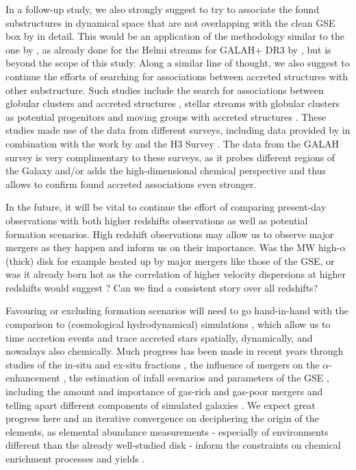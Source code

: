 \documentclass[fleqn,usenatbib]{mnras}
\begin{document}
In a follow-up study, we also strongly suggest to try to associate the found substructures in dynamical space that are not overlapping with the clean GSE box by \citet{Feuillet2021} in detail. This would be an application of the methodology similar to the one by \citet{Naidu2020}, as already done for the Helmi streams for GALAH+ DR3 by \citet{Limberg2021}, but is beyond the scope of this study. Along a similar line of thought, we also suggest to continue the efforts of searching for associations between accreted structures with other substructure. Such studies include the search for associations between globular clusters and accreted structures \citep{Massari2019}, stellar streams with globular clusters as potential progenitors \citep{Bonaca2021} and moving groups with accreted structures \citep{Schuler2021}. These studies made use of the data from different surveys, including data provided by \cite{Helmi2018b} in combination with the work by \citet{Vasiliev2019} and the H3 Survey \citep{Conroy2019}. The data from the GALAH survey is very complimentary to these surveys, as it probes different regions of the Galaxy and/or adds the high-dimensional chemical perspective and thus allows to confirm found accreted associations even stronger.

In the future, it will be vital to continue the effort of comparing present-day observations with both higher redshifts observations as well as potential formation scenarios. High redshift observations may allow us to observe major mergers as they happen and inform us on their importance. Was the MW high-$\alpha$ (thick) disk for example heated up by major mergers like those of the GSE, or was it already born hot as the correlation of higher velocity dispersions at higher redshifts would suggest \citep{Wisnioski2015, Leaman2017}? Can we find a consistent story over all redshifts?

Favouring or excluding formation scenarios will need to go hand-in-hand with the comparison to (cosmological hydrodynamical) simulations \citep[e.g.][]{Mackereth2018, Bonaca2017, Wu2021}, which allow us to time accretion events and trace accreted stars spatially, dynamically, and nowadays also chemically. Much progress has been made in recent years through studies of the in-situ and ex-situ fractions \citep[e.g.][]{Pillepich2015}, the influence of mergers on the $\alpha$-enhancement \citep[e.g.][]{Zolotov2010, Grand2020, Buck2020, Renaud2021}, the estimation of infall scenarios and parameters of the GSE \citep[e.g.][]{Villalobos2008, Koppelman2021, Naidu2021}, including the amount and importance of gas-rich and gas-poor mergers \citep[e.g.][]{Fensch2017, Renaud2021b} and telling apart different components of simulated galaxies \citep[e.g.][]{Obreja2019}. We expect great progress here and an iterative convergence on deciphering the origin of the elements, as elemental abundance measurements - especially of environments different than the already well-studied disk - inform the constraints on chemical enrichment processes and yields \citep[e.g.][]{FernandezAlvar2018b, Vincenzo2019, Eitner2020, Sanders2021, Ishigaki2021}.
\end{document}
